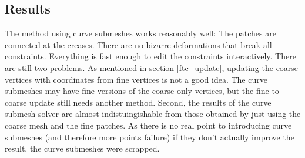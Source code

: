 \documentclass[a4paper,twoside,12pt,nochapterprefix]{scrbook}
\begin{document}
\subsection{Results}
The method using curve submeshes works reasonably well: The patches are connected at the creases. There are no bizarre deformations that break all constraints. Everything is fast enough to edit the constraints interactively. There are still two problems.\newline
As mentioned in section \ref{ftc_update}, updating the coarse vertices with coordinates from fine vertices is not a good idea. The curve submeshes may have fine versions of the coarse-only vertices, but the fine-to-coarse update still needs another method.\newline
Second, the results of the curve submesh solver are almost indistuingishable from those obtained by just using the coarse mesh and the fine patches. As there is no real point to introducing curve submeshes (and therefore more points failure) if they don't actually improve the result, the curve submeshes were scrapped.\newline
\end{document}
